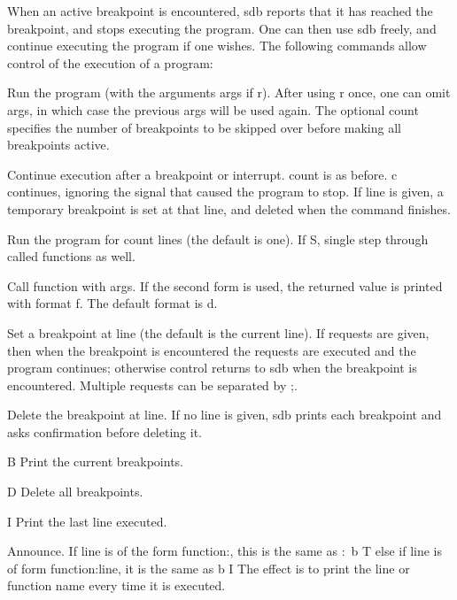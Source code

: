 When  an active  breakpoint  is encountered, {\cmd sdb } reports
that  it  has reached  the  breakpoint,  and  stops executing the
program. One can then use {\cmd sdb} freely, and continue executing
the program if  one wishes.  The following commands allow   control
of the execution of a program:
\begin{hanglist}
	Run the program (with the arguments {\ms args\/} if {\cd r}).
   After using  {\cd r} once, one can omit  {\ms args\/}, in which case
   the previous  {\ms args\/}  will  be  used  again.  The  optional
   {\ms count\/} specifies  the number  of breakpoints to be skipped
   over before making all breakpoints active.

	Continue  execution   after   a   breakpoint   or
   interrupt. {\ms count\/}  is as before. {\cd c} continues, ignoring the
   signal that caused the program to stop. If {\ms line\/} is given,
   a temporary  breakpoint is  set at  that line,  and deleted
   when the command finishes.

	Run the  program for  {\ms count\/} lines  (the default is one).  
	If {\cd S}, single step through called functions as well.

	Call   {\ms function\/}  with  {\ms args\/}.  If  the
   second form  is used,  the returned  value is  printed with
   format {\cd f}. The default format is {\cd d}.

   Set a  breakpoint at  {\ms line\/} (the  default is the
   current line).  If {\ms requests\/}  are  given,  then  when  the
   breakpoint is  encountered the  {\ms requests\/} are executed and
   the program  continues; otherwise  control returns  to  {\cmd sdb}
   when the  breakpoint is  encountered. Multiple requests can
   be separated by {\cd ;}.

   Delete the breakpoint at {\ms line\/}. If no {\ms line\/} is given,
   {\cmd sdb} prints each  breakpoint and  asks confirmation before
   deleting it.

\item[\cd B]   Print the current breakpoints.

\item[\cd D]   Delete all breakpoints.

\item[\cd I] Print the last line executed.

 Announce. If  {\ms line\/} is  of the form  {\ms function\/}:, this 
is the same as  {:\ b T}  else  if  {\ms line\/}  is 
of  form {\ms function\/}:{\ms line\/}, it  is the  same as {b I} The effect is to  print the  line or  function name  every
time  it is executed.
\end{hanglist}
